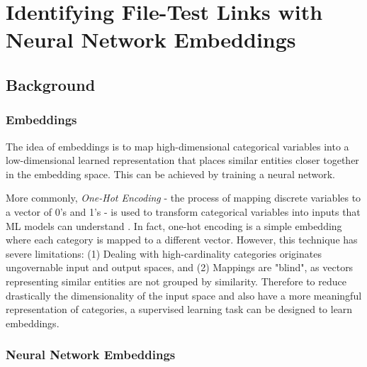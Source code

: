 
\chapter{Identifying File-Test Links with Neural Network Embeddings}
\label{chapter:paper2}


\section{Background}

\subsection{Embeddings}
The idea of embeddings is to map high-dimensional categorical variables into a low-dimensional learned representation that places similar entities closer together in the embedding space. This can be achieved by training a neural network. 
\par More commonly, \textit{One-Hot Encoding} - the process of mapping discrete variables to a vector of 0's and 1's - is used to transform categorical variables into inputs that ML models can understand . In fact, one-hot encoding is a simple embedding where each category is mapped to a different vector. However, this technique has severe limitations: (1) Dealing with high-cardinality categories originates ungovernable input and output spaces, and (2) Mappings are "blind", as vectors representing similar entities are not grouped by similarity. 
Therefore to reduce drastically the dimensionality of the input space and also have a more meaningful representation of categories, a supervised learning task can be designed to learn embeddings.

\subsection{Neural Network Embeddings}

